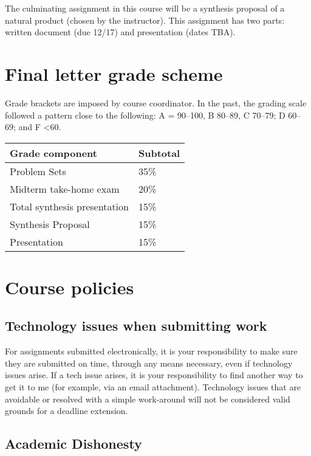 The culminating assignment in this course will be a synthesis proposal
of a natural product (chosen by the instructor). This assignment has two
parts: written document (due 12/17) and presentation (dates TBA).

\hypertarget{final-letter-grade-scheme}{%
\section{Final letter grade scheme}\label{final-letter-grade-scheme}}

Grade brackets are imposed by course coordinator. In the past, the
grading scale followed a pattern close to the following: A = 90--100, B
80--89, C 70--79; D 60--69; and F \textless60.

\begin{longtable}[]{@{}ll@{}}
\toprule
Grade component & Subtotal\tabularnewline
\midrule
\endhead
Problem Sets & 35\%\tabularnewline
Midterm take-home exam & 20\%\tabularnewline
Total synthesis presentation & 15\%\tabularnewline
Synthesis Proposal & 15\%\tabularnewline
Presentation & 15\%\tabularnewline
\bottomrule
\end{longtable}

\hypertarget{course-policies}{%
\section{Course policies}\label{course-policies}}

\hypertarget{technology-issues-when-submitting-work}{%
\subsection{Technology issues when submitting
work}\label{technology-issues-when-submitting-work}}

For assignments submitted electronically, it is your responsibility to
make sure they are submitted on time, through any means necessary, even
if technology issues arise. If a tech issue arises, it is your
responsibility to find another way to get it to me (for example, via an
email attachment). Technology issues that are avoidable or resolved with
a simple work-around will not be considered valid grounds for a deadline
extension.

\hypertarget{academic-dishonesty}{%
\subsection{Academic Dishonesty}\label{academic-dishonesty}}

